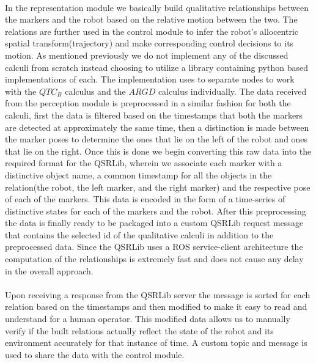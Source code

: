 \paragraph{} In the representation module we basically build qualitative relationships between the markers and the robot based on the relative motion between the two. The relations are further used in the control module to infer the robot's allocentric spatial transform(trajectory) and make corresponding control decisions to its motion. As mentioned previously we do not implement any of the discussed calculi from scratch instead choosing to utilize a library containing python based implementations of each. The implementation uses to separate nodes to work with the $QTC_B$ calculus and the $ARGD$ calculus individually. The data received from the perception module is preprocessed in a similar fashion for both the calculi, first the data is filtered based on the timestamps that both the markers are detected at approximately the same time, then a distinction is made between the marker poses to determine the ones that lie on the left of the robot and ones that lie on the right. Once this is done we begin converting this raw data into the required format for the QSRLib, wherein we associate each marker with a distinctive object name, a common timestamp for all the objects in the relation(the robot, the left marker, and the right marker) and the respective pose of each of the markers. This data is encoded in the form of a time-series of distinctive states for each of the markers and the robot. After this preprocessing the data is finally ready to be packaged into a custom QSRLib request message that contains the selected id of the qualitative calculi in addition to the preprocessed data. Since the QSRLib uses a ROS service-client architecture the computation of the relationships is extremely fast and does not cause any delay in the overall approach.

\paragraph{} Upon receiving a response from the QSRLib server the message is sorted for each relation based on the timestamps and then modified to make it easy to read and understand for a human operator. This modified data allows us to manually verify if the built relations actually reflect the state of the robot and its environment accurately for that instance of time. A custom topic and message is used to share the data with the control module.

